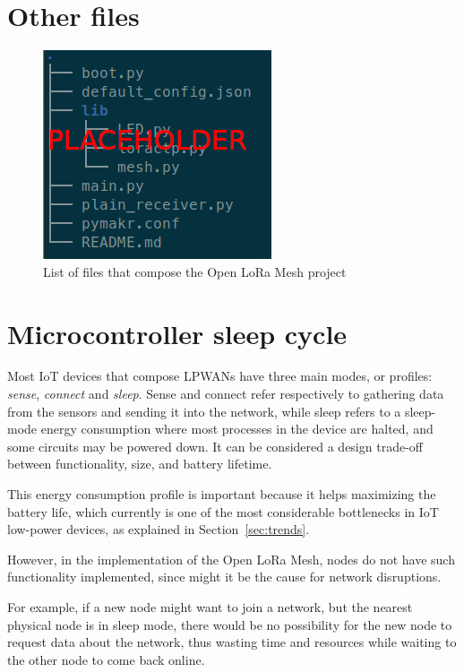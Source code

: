 		
	\section{Other files}
	
		\begin{figure}[h]
			\centering
			\includegraphics[width=.5\textwidth]{resources/img/chap5/tree_files}
			\caption{List of files that compose the Open LoRa Mesh project}
			\label{img:files}
		\end{figure}
		
	\section{Microcontroller sleep cycle}\label{sec:sleep}
	
		Most IoT devices that compose LPWANs have three main modes, or profiles: \textit{sense}, \textit{connect} and \textit{sleep}.
		Sense and connect refer respectively to gathering data from the sensors and sending it into the network, while sleep refers to a sleep-mode energy consumption where most processes in the device are halted, and some circuits may be powered down.
		It can be considered a design trade-off between functionality, size, and battery lifetime.
		
		This energy consumption profile is important because it helps maximizing the battery life, which currently is one of the most considerable bottlenecks in IoT low-power devices, as explained in Section~\ref{sec:trends}.
		
		However, in the implementation of the Open LoRa Mesh, nodes do not have such functionality implemented, since might it be the cause for network disruptions.
		
		For example, if a new node might want to join a network, but the nearest physical node is in sleep mode, there would be no possibility for the new node to request data about the network, thus wasting time and resources while waiting to the other node to come back online.
		
